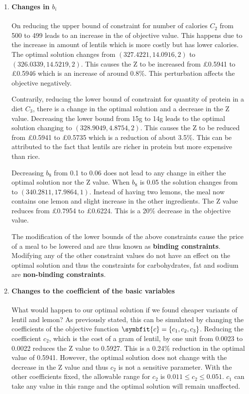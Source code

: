 \documentclass[
]{article}
\begin{document}
\begin{enumerate}
	\item \textbf{Changes in \(b_i\)}\\
	      \\
	      On reducing the upper bound of constraint for number of calories \(C_2\) from 500 to 499 leads to an increase in the of objective value. This happens due to the increase in amount of lentils which is more costly but has lower calories.
	      The optimal solution changes from $\left(327.4221, 14.0916, 2\right)$ to $\left(326.0339, 14.5219, 2\right)$. This causes the Z to be increased from \pounds 0.5941 to \pounds 0.5946 which is an increase of around 0.8\%. This perturbation affects the objective negatively.
	      	          
	      Contrarily, reducing the lower bound of constraint for quantity of protein in a diet \(C_3\), there is a change in the optimal solution and a decrease in the Z value.    
	      Decreasing the lower bound from 15g to 14g leads to the optimal solution changing to $\left(328.9049, 4.8754, 2\right)$.
	      This causes the Z to be reduced from \pounds 0.5941 to \pounds 0.5735 which is a reduction of about 3.5\%. This can be attributed to the fact that lentils are richer in protein but more expensive than rice.
	      	          
	      Decreasing $b_8$ from 0.1 to 0.06 does not lead to any change in either the optimal solution nor the Z value. When $b_8$ is 0.05 the solution changes from to $\left(340.2811, 17.9864, 1\right)$.
	      Instead of having two lemons, the meal now contains one lemon and slight increase in the other ingredients. The Z value reduces from \pounds 0.7954 to \pounds 0.6224. This is a 20\% decrease in the objective value.
	      	      
	      The modification of the lower bounds of the above constraints cause the price of a meal to be lowered and are thus known as \textbf{binding constraints}.
	      Modifying any of the other constraint values do not have an effect on the optimal solution and thus the constraints for carbohydrates, fat and sodium are \textbf{non-binding constraints}. 
	      	          
	\item \textbf{Changes to the coefficient of the basic variables} \\
	      \\
	      What would happen to our optimal solution if we found cheaper variants of lentil and lemon? As previously stated, this can be simulated by changing the coefficients of the objective function $\symbfit{c} = \{c_1, c_2, c_3 \}$.
	      Reducing the coefficient $c_2$, which is the cost of a gram of lentil, by one unit from 0.0023 to 0.0022 reduces the Z value to 0.5927. This is a 0.24\% reduction in the optimal value of 0.5941.
	      However, the optimal solution does not change with the decrease in the Z value and thus $c_2$ is not a sensitive parameter.
	      With the other coefficients fixed, the allowable range for $c_2$ is \(0.011 \le c_2 \le 0.051\). $c_1$ can take any value in this range and the optimal solution will remain unaffected.
	      	        

\end{enumerate}
\end{document}
